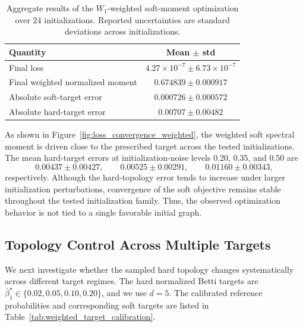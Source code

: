 \documentclass[pdflatex,sn-mathphys-num]{sn-jnl}%
\theoremstyle{thmstyleone}%
\theoremstyle{thmstyletwo}%
\theoremstyle{thmstylethree}%
\begin{document}
\begin{table}[t]
    \centering
    \caption{
    Aggregate results of the \(W_1\)-weighted soft-moment optimization over \(24\) initializations.
    Reported uncertainties are standard deviations across initializations.
    }
    \label{tab:weighted_betti_optimization}
    \begin{tabular}{l|c}
        \hline
        Quantity & Mean \(\pm\) std \\
        \hline
        Final loss
        & \(4.27\times10^{-7}\pm6.73\times10^{-7}\) \\
        Final weighted normalized moment
        & \(0.674839\pm0.000917\) \\
        Absolute soft-target error
        & \(0.000726\pm0.000572\) \\
        Absolute hard-target error
        & \(0.00707\pm0.00482\) \\
        \hline
    \end{tabular}
\end{table}

As shown in Figure~\ref{fig:loss_convergence_weighted}, the weighted soft spectral moment is driven close to the prescribed target across the tested initializations.
The mean hard-target errors at initialization-noise levels \(0.20\), \(0.35\), and \(0.50\) are
\[
0.00437\pm0.00427,
\qquad
0.00525\pm0.00291,
\qquad
0.01160\pm0.00343,
\]
respectively.
Although the hard-topology error tends to increase under larger initialization perturbations, convergence of the soft objective remains stable throughout the tested initialization family.
Thus, the observed optimization behavior is not tied to a single favorable initial graph.


\subsection{Topology Control Across Multiple Targets}

We next investigate whether the sampled hard topology changes systematically across different target regimes.
The hard normalized Betti targets are
$\bar{\beta}_1^\star
\in
\{0.02,0.05,0.10,0.20\}$,
and we use \(d=5\).
The calibrated reference probabilities and corresponding soft targets are listed in Table~\ref{tab:weighted_target_calibration}.
\end{document}
